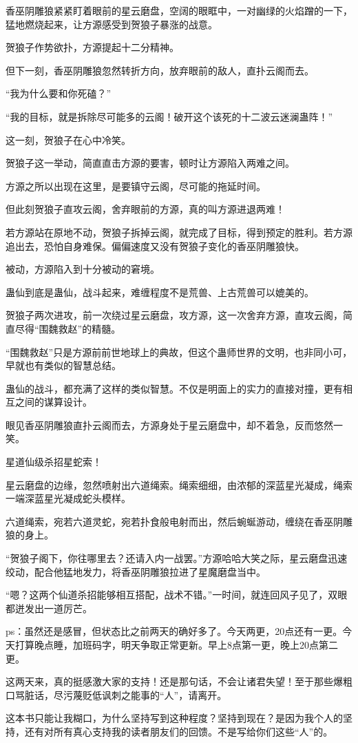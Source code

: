 \begin{this_body}
香巫阴雕狼紧紧盯着眼前的星云磨盘，空阔的眼眶中，一对幽绿的火焰蹭的一下，猛地燃烧起来，让方源感受到贺狼子暴涨的战意。

贺狼子作势欲扑，方源提起十二分精神。

但下一刻，香巫阴雕狼忽然转折方向，放弃眼前的敌人，直扑云阁而去。

“我为什么要和你死磕？”

“我的目标，就是拆除尽可能多的云阁！破开这个该死的十二波云迷澜蛊阵！”

这一刻，贺狼子在心中冷笑。

贺狼子这一举动，简直直击方源的要害，顿时让方源陷入两难之间。

方源之所以出现在这里，是要镇守云阁，尽可能的拖延时间。

但此刻贺狼子直攻云阁，舍弃眼前的方源，真的叫方源进退两难！

若方源站在原地不动，贺狼子拆掉云阁，就完成了目标，得到预定的胜利。若方源追出去，恐怕自身难保。偏偏速度又没有贺狼子变化的香巫阴雕狼快。

被动，方源陷入到十分被动的窘境。

蛊仙到底是蛊仙，战斗起来，难缠程度不是荒兽、上古荒兽可以媲美的。

贺狼子两次进攻，前一次绕过星云磨盘，攻方源，这一次舍弃方源，直攻云阁，简直尽得“围魏救赵”的精髓。

“围魏救赵”只是方源前前世地球上的典故，但这个蛊师世界的文明，也非同小可，早就也有类似的智慧总结。

蛊仙的战斗，都充满了这样的类似智慧。不仅是明面上的实力的直接对撞，更有相互之间的谋算设计。

眼见香巫阴雕狼直扑云阁而去，方源身处于星云磨盘中，却不着急，反而悠然一笑。

星道仙级杀招星蛇索！

星云磨盘的边缘，忽然喷射出六道绳索。绳索细细，由浓郁的深蓝星光凝成，绳索一端深蓝星光凝成蛇头模样。

六道绳索，宛若六道灵蛇，宛若扑食般电射而出，然后蜿蜒游动，缠绕在香巫阴雕狼的身上。

“贺狼子阁下，你往哪里去？还请入内一战罢。”方源哈哈大笑之际，星云磨盘迅速绞动，配合他猛地发力，将香巫阴雕狼拉进了星魔磨盘当中。

“嗯？这两个仙道杀招能够相互搭配，战术不错。”一时间，就连回风子见了，双眼都迸发出一道厉芒。

ps：虽然还是感冒，但状态比之前两天的确好多了。今天两更，20点还有一更。今天打算晚点睡，加班码字，明天争取正常更新。早上8点第一更，晚上20点第二更。

这两天来，真的挺感激大家的支持！还是那句话，不会让诸君失望！至于那些爆粗口骂脏话，尽污蔑贬低讽刺之能事的“人”，请离开。

这本书只能让我糊口，为什么坚持写到这种程度？坚持到现在？是因为我个人的坚持，还有对所有真心支持我的读者朋友们的回馈。不是写给你们这些“人”的。

\end{this_body}

